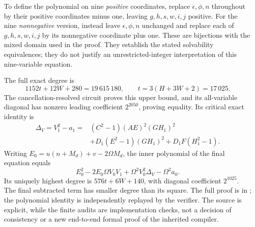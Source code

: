 To define the polynomial on nine \emph{positive} coordinates, replace
$\epsilon,\phi,n$ throughout by their positive coordinates minus one,
leaving $g,h,s,w,i,j$ positive. For the nine \emph{nonnegative} version,
instead leave $\epsilon,\phi,n$ unchanged and replace each of
$g,h,s,w,i,j$ by its nonnegative coordinate plus one. These are bijections
with the mixed domain used in the proof. They establish the stated
solvability equivalences; they do not justify an unrestricted-integer
interpretation of this nine-variable equation.

The full exact degree is
\[
1152t+12W+280=19\,615\,180,
\qquad t=3(H+3W+2)=17\,025.
\]
The cancellation-resolved circuit proves this upper bound, and its
all-variable diagonal has nonzero leading coefficient $2^{2050}$, proving
equality. Its critical exact identity is
\begin{align*}
\Delta_V=V_1^2-a_1
 ={}&(C^2-1)(AE)^2(GH_1)^2\\
   &+D_1(E^2-1)(GH_1)^2+D_1F(H_1^2-1).
\end{align*}
Writing $E_0=u(n+M_d)+v-2\Omega M_d$, the inner polynomial of the
final equation equals
\[
E_0^2-2E_0\Omega V_0V_1+\Omega^2V_0^2\Delta_V-\Omega^2a_0.
\]
Its uniquely highest degree is $576t+6W+140$, with diagonal coefficient
$2^{1025}$. The final subtracted term has smaller degree than its square.
The full proof is in ; the polynomial identity is
independently replayed by the verifier. The source is explicit, while the
finite audits are implementation checks, not a decision of consistency
or a new end-to-end formal proof of the inherited compiler.
